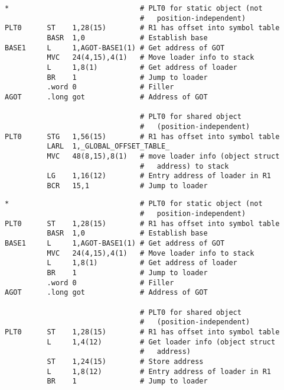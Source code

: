 \documentclass[english,11pt,twoside,toc=bib,toc=idx]{scrreprt}
\begin{document}
\ifzseries
\begin{lstlisting}[style=float,language=simpleasm,label=lst:plt0ex,
  caption=Special first entry in Procedure Linkage Table]
*                               # PLT0 for static object (not
                                #   position-independent)
PLT0      ST    1,28(15)        # R1 has offset into symbol table
          BASR  1,0             # Establish base
BASE1     L     1,AGOT-BASE1(1) # Get address of GOT
          MVC   24(4,15),4(1)   # Move loader info to stack
          L     1,8(1)          # Get address of loader
          BR    1               # Jump to loader
          .word 0               # Filler
AGOT      .long got             # Address of GOT

                                # PLT0 for shared object
                                #   (position-independent)
PLT0      STG   1,56(15)        # R1 has offset into symbol table
          LARL  1,_GLOBAL_OFFSET_TABLE_
          MVC   48(8,15),8(1)   # move loader info (object struct
                                #   address) to stack
          LG    1,16(12)        # Entry address of loader in R1
          BCR   15,1            # Jump to loader
\end{lstlisting}
\else
\begin{lstlisting}[style=float,language=simpleasm,label=lst:plt0ex,
  caption=Special first entry in Procedure Linkage Table]
*                               # PLT0 for static object (not
                                #   position-independent)
PLT0      ST    1,28(15)        # R1 has offset into symbol table
          BASR  1,0             # Establish base
BASE1     L     1,AGOT-BASE1(1) # Get address of GOT
          MVC   24(4,15),4(1)   # Move loader info to stack
          L     1,8(1)          # Get address of loader
          BR    1               # Jump to loader
          .word 0               # Filler
AGOT      .long got             # Address of GOT

                                # PLT0 for shared object
                                #   (position-independent)
PLT0      ST    1,28(15)        # R1 has offset into symbol table
          L     1,4(12)         # Get loader info (object struct
                                #   address)
          ST    1,24(15)        # Store address
          L     1,8(12)         # Entry address of loader in R1
          BR    1               # Jump to loader
\end{lstlisting}
\fi
\end{document}

